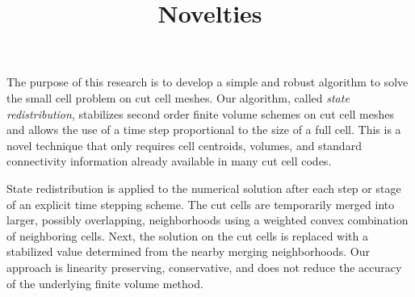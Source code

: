 \documentclass{article}
\title{Novelties}
\date{}
\begin{document}
\maketitle

The purpose of this research is to develop a simple and robust algorithm 
to solve the small cell problem on cut cell meshes.
Our algorithm, called \textit{state redistribution}, stabilizes second order 
finite volume schemes on cut cell meshes and allows the use of a time step 
proportional to the size of a full cell.  
This is a novel technique that only requires cell centroids, volumes, and 
standard connectivity information already available in many cut cell codes.

State redistribution is applied to the numerical solution after each step 
or stage of an explicit time stepping scheme.
The cut cells are temporarily merged into 
larger, possibly overlapping, neighborhoods using a weighted convex
combination of neighboring cells.
Next, the solution on the cut cells is replaced with a stabilized 
value determined from the nearby merging neighborhoods.
Our approach is linearity preserving, conservative, and does not reduce the accuracy of the underlying finite volume method.
\end{document}
